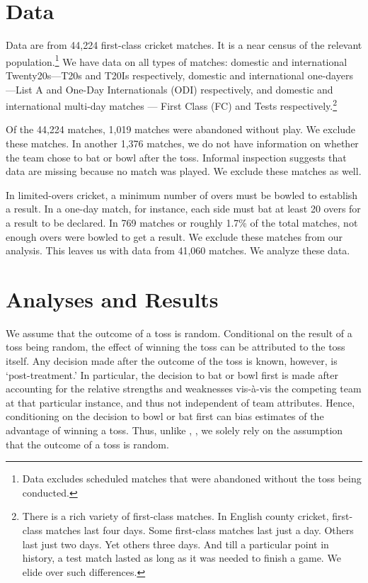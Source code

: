 \documentclass[12pt]{article}
\begin{document}
\section*{Data}
Data are from 44,224 first-class cricket matches. It is a near census of the relevant population.\footnote{Data excludes scheduled matches that were abandoned without the toss being conducted.} We have data on all types of matches: domestic and international Twenty20s---T20s and T20Is respectively, domestic and international one-dayers---List A and One-Day Internationals (ODI) respectively, and domestic and international multi-day matches --- First Class (FC) and Tests respectively.\footnote{There is a rich variety of first-class matches. In English county cricket, first-class matches last four days. Some first-class matches last just a day. Others last just two days. Yet others three days. And till a particular point in history, a test match lasted as long as it was needed to finish a game. We elide over such differences.} 

Of the 44,224 matches, 1,019 matches were abandoned without play. We exclude these matches. In another 1,376 matches, we do not have information on whether the team chose to bat or bowl after the toss. Informal inspection suggests that data are missing because no match was played. We exclude these matches as well. 

In limited-overs cricket, a minimum number of overs must be bowled to establish a result. In a one-day match, for instance, each side must bat at least 20 overs for a result to be declared. In 769 matches or roughly 1.7\% of the total matches, not enough overs were bowled to get a result. We exclude these matches from our analysis. This leaves us with data from 41,060 matches. We analyze these data.
 
\section*{Analyses and Results}
We assume that the outcome of a toss is random. Conditional on the result of a toss being random, the effect of winning the toss can be attributed to the toss itself. Any decision made after the outcome of the toss is known, however, is `post-treatment.' In particular, the decision to bat or bowl first is made after accounting for the relative strengths and weaknesses vis-\`{a}-vis the competing team at that particular instance, and thus not independent of team attributes. Hence, conditioning on the decision to bowl or bat first can bias estimates of the advantage of winning a toss. Thus, unlike \citet{dawson2009bat}, \citet{Saad2015}, we solely rely on the assumption that the outcome of a toss is random. 
\end{document}
